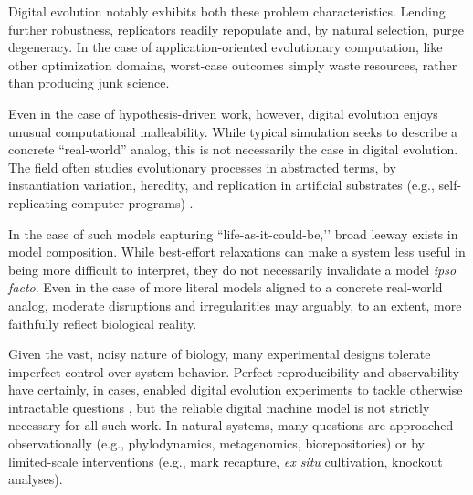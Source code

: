 Digital evolution notably exhibits both these problem characteristics.
Lending further robustness, replicators readily repopulate and, by natural selection, purge degeneracy.
In the case of application-oriented evolutionary computation, like other optimization domains, worst-case outcomes simply waste resources, rather than producing junk science.

Even in the case of hypothesis-driven work, however, digital evolution enjoys unusual computational malleability.
While typical simulation seeks to describe a concrete ``real-world'' analog, this is not necessarily the case in digital evolution.
The field often studies evolutionary processes in abstracted terms, by instantiation variation, heredity, and replication in artificial substrates (e.g., self-replicating computer programs) \cite{pennock2007models,bonabeau1994we}.

In the case of such models capturing ``life-as-it-could-be,’’ broad leeway exists in model composition.
While best-effort relaxations can make a system less useful in being more difficult to interpret, they do not necessarily invalidate a model \textit{ipso facto}.
Even in the case of more literal models aligned to a concrete real-world analog, moderate disruptions and irregularities may arguably, to an extent, more faithfully reflect biological reality.

Given the vast, noisy nature of biology, many experimental designs tolerate imperfect control over system behavior.
Perfect reproducibility and observability have certainly, in cases, enabled digital evolution experiments to tackle otherwise intractable questions \cite{pontes2020evolutionary,lenski2003evolutionary,grabowski2013case,dolson2020interpreting,fortuna2019coevolutionary,goldsby2014evolutionary,covert2013experiments,zaman2011rapid,bundy2021footprint,dolson2017spatial}, but the reliable digital machine model is not strictly necessary for all such work.
In natural systems, many questions are approached observationally (e.g., phylodynamics, metagenomics, biorepositories) or by limited-scale interventions (e.g., mark recapture, \textit{ex situ} cultivation, knockout analyses).

